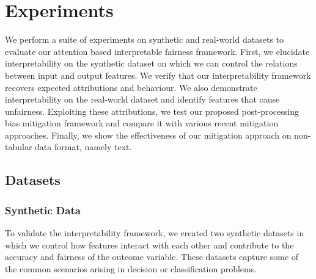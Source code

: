 \vspace{-0.2cm}
\section{Experiments}
\vspace{-0.2cm}
We perform a suite of experiments on synthetic and real-world datasets to evaluate our attention based interpretable fairness framework. First, we elucidate %
interpretability on the synthetic dataset on which we can control the relations between input and output features. We verify that our interpretability framework recovers expected attributions and behaviour. We also demonstrate interpretability on the real-world dataset and identify features that cause unfairness.  Exploiting these attributions, we test our proposed post-processing bias mitigation framework and compare it with various recent mitigation approaches. Finally, we show the effectiveness of our mitigation approach on non-tabular data format, namely text.

\subsection{Datasets}

\newcommand{\bern}{\text{Ber}}

\subsubsection{Synthetic Data} \label{syn_data_sec}
To validate the interpretability framework, we created two synthetic datasets in which we control how features interact with each other and contribute to the accuracy and fairness of the outcome variable.
These datasets capture some of the common scenarios arising in decision or classification problems.

